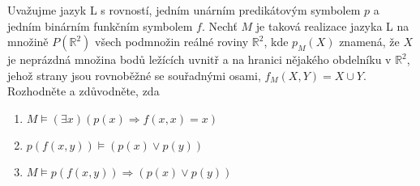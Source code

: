 \subsubsection{}
Uvažujme jazyk L s rovností, jedním unárním predikátovým symbolem $p$ a jedním
binárním funkčním symbolem $f$. Nechť $M$ je taková realizace jazyka L na
množině $P(\mathbb{R}^{2})$ všech podmnožin reálné roviny $\mathbb{R}^{2}$, kde
$p_{M}(X)$ znamená, že $X$ je neprázdná množina bodů ležících uvnitř a na
hranici nějakého obdelníku v $\mathbb{R}^{2}$, jehož strany jsou rovnoběžné se
souřadnými osami, $f_{M}(X,Y) = X \cup Y$. Rozhodněte a zdůvodněte, zda
\begin{enumerate}[(1)]
  \item $M \models (\exists x)(p(x) \Rightarrow f(x,x)=x)$
  \item $p(f(x,y)) \models (p(x) \vee p(y))$
  \item $M \models p(f(x,y)) \Rightarrow (p(x) \vee p(y))$
\end{enumerate}

